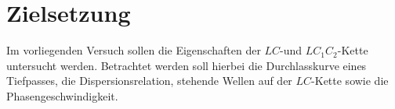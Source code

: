 \section{Zielsetzung}
\label{sec:Zielsetzung}
Im vorliegenden Versuch sollen die Eigenschaften der $LC$-und $LC_1C_2$-Kette untersucht werden.
Betrachtet werden soll hierbei die Durchlasskurve eines Tiefpasses, die Dispersionsrelation,
stehende Wellen auf der $LC$-Kette sowie die Phasengeschwindigkeit.

